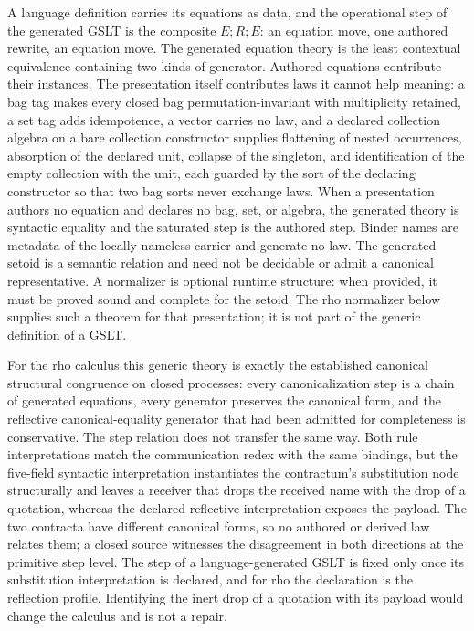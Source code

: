 \documentclass[11pt]{article}
\theoremstyle{definition}
\theoremstyle{remark}
\begin{document}
A language definition carries its equations as data, and the operational
step of the generated GSLT is the composite $E;R;E$: an equation move, one
authored rewrite, an equation move.  The generated equation theory is the
least contextual equivalence containing two kinds of generator.  Authored
equations contribute their instances.  The presentation itself contributes
laws it cannot help meaning: a bag tag makes every closed bag
permutation-invariant with multiplicity retained, a set tag adds idempotence,
a vector carries no law, and a declared collection algebra on a bare
collection constructor supplies flattening of nested occurrences, absorption
of the declared unit, collapse of the singleton, and identification of the
empty collection with the unit, each guarded by the sort of the declaring
constructor so that two bag sorts never exchange laws.  When a presentation
authors no equation and declares no bag, set, or algebra, the generated
theory is syntactic equality and the saturated step is the authored step.
Binder names are metadata of the locally nameless carrier and generate no law.
The generated setoid is a semantic relation and need not be decidable or admit
a canonical representative.  A normalizer is optional runtime structure: when
provided, it must be proved sound and complete for the setoid.  The rho
normalizer below supplies such a theorem for that presentation; it is not part
of the generic definition of a GSLT.

For the rho calculus this generic theory is exactly the established
canonical structural congruence on closed processes: every canonicalization
step is a chain of generated equations, every generator preserves the
canonical form, and the reflective canonical-equality generator that had been
admitted for completeness is conservative.  The step relation does not
transfer the same way.  Both rule interpretations match the communication
redex with the same bindings, but the five-field syntactic interpretation
instantiates the contractum's substitution node structurally and leaves a
receiver that drops the received name with the drop of a quotation, whereas
the declared reflective interpretation exposes the payload.  The two
contracta have different canonical forms, so no authored or derived law
relates them; a closed source witnesses the disagreement in both directions
at the primitive step level.  The step of a language-generated GSLT is fixed
only once its substitution interpretation is declared, and for rho the
declaration is the reflection profile.  Identifying the inert drop of a
quotation with its payload would change the calculus and is not a repair.
\end{document}
